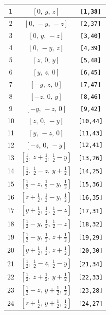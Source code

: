 \documentclass[fleqn,8pt]{jsarticle}
\begin{document}
\begin{longtable}{ccc}
1 & $\left[ 0,\, y,\, z \right]$ & {\tt [1,38]} \\ \hline
2 & $\left[ 0,\, - y,\, - z \right]$ & {\tt [2,37]} \\ \hline
3 & $\left[ 0,\, y,\, - z \right]$ & {\tt [3,40]} \\ \hline
4 & $\left[ 0,\, - y,\, z \right]$ & {\tt [4,39]} \\ \hline
5 & $\left[ z,\, 0,\, y \right]$ & {\tt [5,48]} \\ \hline
6 & $\left[ y,\, z,\, 0 \right]$ & {\tt [6,45]} \\ \hline
7 & $\left[ - y,\, z,\, 0 \right]$ & {\tt [7,47]} \\ \hline
8 & $\left[ - z,\, 0,\, y \right]$ & {\tt [8,46]} \\ \hline
9 & $\left[ - y,\, - z,\, 0 \right]$ & {\tt [9,42]} \\ \hline
10 & $\left[ z,\, 0,\, - y \right]$ & {\tt [10,44]} \\ \hline
11 & $\left[ y,\, - z,\, 0 \right]$ & {\tt [11,43]} \\ \hline
12 & $\left[ - z,\, 0,\, - y \right]$ & {\tt [12,41]} \\ \hline
13 & $\left[ \frac{1}{2},\, z + \frac{1}{2},\, \frac{1}{2} - y \right]$ & {\tt [13,26]} \\ \hline
14 & $\left[ \frac{1}{2},\, \frac{1}{2} - z,\, y + \frac{1}{2} \right]$ & {\tt [14,25]} \\ \hline
15 & $\left[ \frac{1}{2} - z,\, \frac{1}{2} - y,\, \frac{1}{2} \right]$ & {\tt [15,36]} \\ \hline
16 & $\left[ z + \frac{1}{2},\, \frac{1}{2} - y,\, \frac{1}{2} \right]$ & {\tt [16,35]} \\ \hline
17 & $\left[ y + \frac{1}{2},\, \frac{1}{2},\, \frac{1}{2} - z \right]$ & {\tt [17,31]} \\ \hline
18 & $\left[ \frac{1}{2} - y,\, \frac{1}{2},\, \frac{1}{2} - z \right]$ & {\tt [18,32]} \\ \hline
19 & $\left[ \frac{1}{2} - y,\, \frac{1}{2},\, z + \frac{1}{2} \right]$ & {\tt [19,29]} \\ \hline
20 & $\left[ y + \frac{1}{2},\, \frac{1}{2},\, z + \frac{1}{2} \right]$ & {\tt [20,30]} \\ \hline
21 & $\left[ \frac{1}{2},\, \frac{1}{2} - z,\, \frac{1}{2} - y \right]$ & {\tt [21,34]} \\ \hline
22 & $\left[ \frac{1}{2},\, z + \frac{1}{2},\, y + \frac{1}{2} \right]$ & {\tt [22,33]} \\ \hline
23 & $\left[ \frac{1}{2} - z,\, y + \frac{1}{2},\, \frac{1}{2} \right]$ & {\tt [23,28]} \\ \hline
24 & $\left[ z + \frac{1}{2},\, y + \frac{1}{2},\, \frac{1}{2} \right]$ & {\tt [24,27]} \\
\end{longtable}
\end{document}
